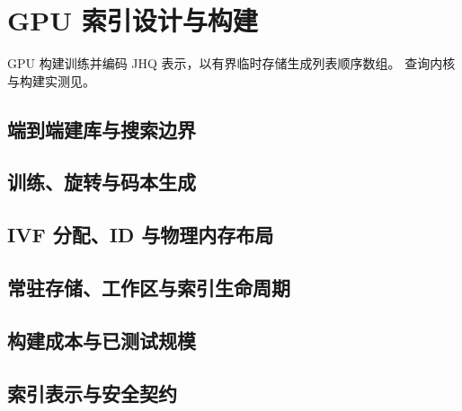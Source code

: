 \chapter{GPU 索引设计与构建}
\label{ch:architecture}
GPU 构建训练并编码 JHQ 表示，以有界临时存储生成列表顺序数组\cite{jhq}。
查询内核与构建实测见。

\section{端到端建库与搜索边界}
\label{sec:4-1}


\section{训练、旋转与码本生成}
\label{sec:4-2}


\section{IVF 分配、ID 与物理内存布局}
\label{sec:4-3}


\section{常驻存储、工作区与索引生命周期}
\label{sec:4-4}


\section{构建成本与已测试规模}
\label{sec:4-5}


\section{索引表示与安全契约}
\label{sec:4-6}


